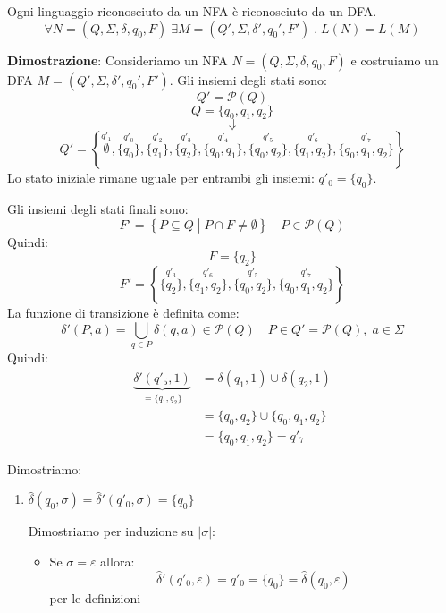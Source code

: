 \documentclass[a4paper]{article}
\begin{document}
\begin{theorem}
  Ogni linguaggio riconosciuto da un NFA è riconosciuto da un DFA.
  \[
    \forall N = (Q, \Sigma, \delta, q_0, F) \; \exists M = (Q', \Sigma, \delta', q_0', F') \;.\;
    L(N) = L(M)
  \] 

  \vspace{1em}
  \noindent
  \textbf{Dimostrazione}: Consideriamo un NFA \( N = (Q, \Sigma, \delta, q_0, F) \) e
  costruiamo un DFA \( M = (Q', \Sigma, \delta', q_0', F') \).
  Gli insiemi degli stati sono:
  \[
    Q' = \mathcal{P}(Q)
  \] 
  \[
   Q = \{q_0, q_1, q_2\}
  \] 
  \[
    \Downarrow
  \] 
  \[
    Q' = \left\{ 
      \stackrel{q'_1}{\emptyset}, \stackrel{q'_0}{\{q_0\}}, \stackrel{q'_2}{\{q_1\}},
      \stackrel{q'_3}{\{q_2\}}, \stackrel{q'_4}{\{q_0, q_1\}}, \stackrel{q'_5}{\{q_0, q_2\}},
      \stackrel{q'_6}{\{q_1, q_2\}}, \stackrel{q'_7}{\{q_0, q_1, q_2\}}
    \right\}
  \] 
  Lo stato iniziale rimane uguale per entrambi gli insiemi: \( q'_0 = \{q_0\}  \).

  Gli insiemi degli stati finali sono:
  \[
    F' = \left\{ P \subseteq Q \;\left|\; P \cap F \neq \emptyset \right. \right\} \quad
    P \in \mathcal{P}(Q)
  \] 
  Quindi:
  \[
    F = \{q_2\} 
  \] 
  \[
    F' = \left\{ \stackrel{q'_3}{\{q_2\}}, \stackrel{q'_6}{\{q_1, q_2\}},
      \stackrel{q'_5}{\{q_0, q_2\}}, \stackrel{q'_7}{\{q_0, q_1, q_2\}}
    \right\}
  \] 
  La funzione di transizione è definita come:
  \[
    \delta'(P, a) = \bigcup_{q \in P} \delta(q, a) \in \mathcal{P}(Q) \quad P \in Q' = \mathcal{P}(Q),\; a \in \Sigma 
  \]
  Quindi:
  \[
    \begin{aligned}
      \underbrace{\delta'(q'_5, 1)}_{= \{q_1, q_2\} }
      &= \delta(q_1, 1) \cup \delta(q_2, 1)\\
                       &= \{q_0, q_2\} \cup \{q_0, q_1, q_2\}\\
                       &= \{q_0, q_1, q_2\} = q'_7
    \end{aligned}
  \] 

  \vspace{1em}
  \noindent
  Dimostriamo: 
  \begin{enumerate}
    \item 
      \( \hat{\delta}(q_0, \sigma) = \hat{\delta}'(q'_0, \sigma) = \{q_0\}  \) 

      \vspace{1em}
      \noindent
      Dimostriamo per induzione su \( \left| \sigma  \right|  \):

      \begin{itemize}
        \item 
          Se \( \sigma = \varepsilon \) allora:
          \[
            \hat{\delta}'(q'_0, \varepsilon) = q'_0 = \{q_0\} = \hat{\delta}(q_0, \varepsilon)
          \] 
          per le definizioni


\end{itemize}
\end{enumerate}
\end{theorem}
\end{document}
